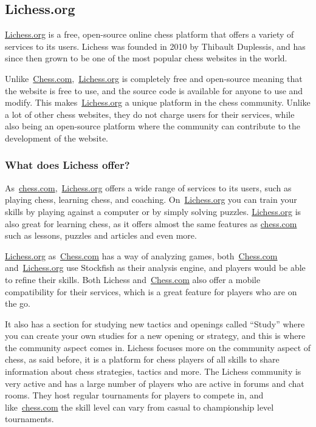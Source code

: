 \subsection{Lichess.org}\label{subsec:lichess-org}

\url{Lichess.org} is a free, open-source online chess platform that offers a variety of services to its users.
Lichess was founded in 2010 by Thibault Duplessis, and has since then grown to be one of the most popular chess websites
in the world.

Unlike~\url{Chess.com},~\url{Lichess.org} is completely free and open-source meaning that the website is free to use,
and the source
code is available for anyone to use and modify.
This makes~\url{Lichess.org} a unique platform in the chess community.
Unlike a lot of other chess websites, they do not charge users for their services, while also being an open-source
platform where the community can contribute to the development of the website.

\subsubsection{What does Lichess offer?}\label{subsubsec:what-does-lichess-offer}

As~\url{chess.com},~\url{Lichess.org} offers a wide range of services to its users, such as playing chess,
learning chess, and coaching.
On~\url{Lichess.org} you can train your skills by playing against a computer or by simply solving puzzles.
\url{Lichess.org} is also great for learning chess, as it offers almost the same features as \url{chess.com}
such as lessons, puzzles and articles and even more.

\url{Lichess.org} as~\url{Chess.com} has a way of analyzing games, both~\url{Chess.com} and~\url{Lichess.org} use
Stockfish as their analysis engine, and players would be able to refine their skills.
Both Lichess and~\url{Chess.com} also offer a mobile compatibility for their services, which is a great feature for
players who are on the go.

It also has a section for studying new tactics and openings called “Study” where you can create your own studies for
a new opening or strategy, and this is where the community aspect comes in.
Lichess focuses more on the community aspect of chess, as said before, it is a platform for chess players of all skills
to share information about chess strategies, tactics and more.
The Lichess community is very active and has a large number of players who are active in forums and chat rooms.
They host regular tournaments for players to compete in, and like~\url{chess.com} the skill level can vary
from casual to championship level tournaments.
